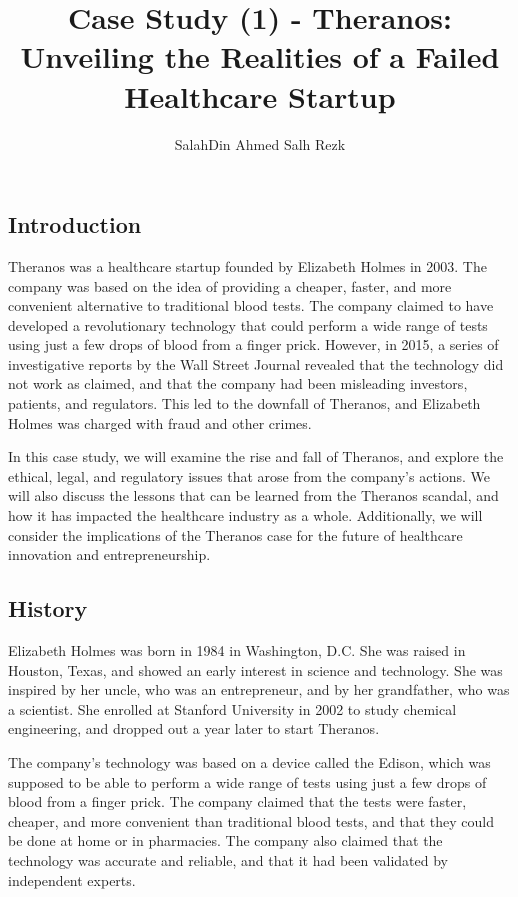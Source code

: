 \documentclass[stu]{apa7}
\title{Case Study (1) - Theranos: Unveiling the Realities of a Failed
Healthcare Startup}
\author{SalahDin Ahmed Salh Rezk}
\affiliation{Zewail City of Science and Technology}
\begin{document}
    \maketitle
    \tableofcontents

    \begin{multicols}{2}
    \section{Introduction}

    Theranos was a healthcare startup founded by Elizabeth Holmes in 2003. The
    company was based on the idea of providing a cheaper, faster, and more
    convenient alternative to traditional blood tests. The company claimed to
    have developed a revolutionary technology that could perform a wide range
    of tests using just a few drops of blood from a finger prick. However, in
    2015, a series of investigative reports by the Wall Street Journal revealed
    that the technology did not work as claimed, and that the company had been
    misleading investors, patients, and regulators. This led to the downfall of
    Theranos, and Elizabeth Holmes was charged with fraud and other crimes.

    In this case study, we will examine the rise and fall of Theranos, and
    explore the ethical, legal, and regulatory issues that arose from the
    company's actions. We will also discuss the lessons that can be learned
    from the Theranos scandal, and how it has impacted the healthcare industry
    as a whole. Additionally, we will consider the implications of the Theranos
    case for the future of healthcare innovation and entrepreneurship.

    \subsection{History}

    Elizabeth Holmes was born in 1984 in Washington, D.C. She was raised in
    Houston, Texas, and showed an early interest in science and technology. She
    was inspired by her uncle, who was an entrepreneur, and by her grandfather,
    who was a scientist. She enrolled at Stanford University in 2002 to study
    chemical engineering, and dropped out a year later to start Theranos. \textcite{inc}

    The company's technology was based on a device called the Edison, which was
    supposed to be able to perform a wide range of tests using just a few drops
    of blood from a finger prick. The company claimed that the tests were
    faster, cheaper, and more convenient than traditional blood tests, and that
    they could be done at home or in pharmacies. The company also claimed that
    the technology was accurate and reliable, and that it had been validated by
    independent experts. \textcite{Auletta_2014}


\end{multicols}
\end{document}
